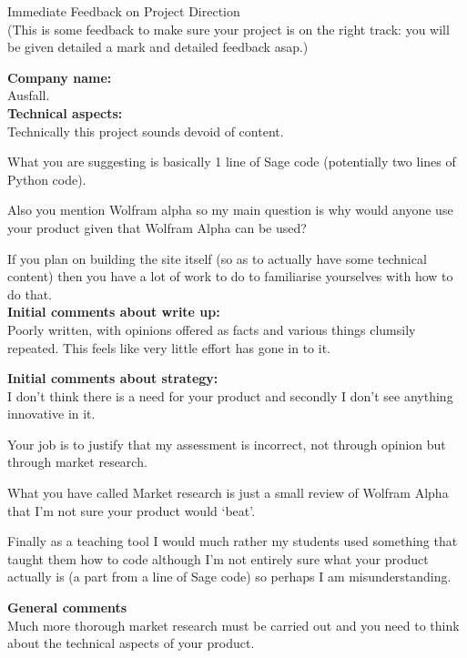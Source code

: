 \documentclass{article}
\begin{document}
\begin{center}
\Huge{Immediate Feedback on Project Direction}\\
\tiny{(This is some feedback to make sure your project is on the right track: you will be given detailed a mark and detailed feedback asap.)}
\end{center}


\normalsize
\textbf{Company name:}\\

Ausfall. \\

\textbf{Technical aspects:}\\

Technically this project sounds devoid of content.

What you are suggesting is basically 1 line of Sage code (potentially two lines of Python code).

Also you mention Wolfram alpha so my main question is why would anyone use your product given that Wolfram Alpha can be used?

If you plan on building the site itself (so as to actually have some technical content) then you have a lot of work to do to familiarise yourselves with how to do that.\\

\textbf{Initial comments about write up:}\\

Poorly written, with opinions offered as facts and various things clumsily repeated. This feels like very little effort has gone in to it.

\textbf{Initial comments about strategy:}\\

I don't think there is a need for your product and secondly I don't see anything innovative in it.

Your job is to justify that my assessment is incorrect, not through opinion but through market research.

What you have called Market research is just a small review of Wolfram Alpha that I'm not sure your product would `beat'.

Finally as a teaching tool I would much rather my students used something that taught them how to code although I'm not entirely sure what your product actually is (a part from a line of Sage code) so perhaps I am misunderstanding.

\textbf{General comments}\\

Much more thorough market research must be carried out and you need to think about the technical aspects of your product.
\end{document}
